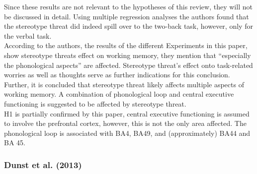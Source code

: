 \documentclass[
  stu]{apa7}
\begin{document}
Since these results are not relevant to the hypotheses of this review, they will not be discussed in detail.
Using multiple regression analyses the authors found that the stereotype threat did indeed spill over to the two-back task, however, only for the verbal task.\\
According to the authors, the results of the different Experiments in this paper, show stereotype threats effect on working memory, they mention that ``especially the phonological aspects'' are affected.
Stereotype threat's effect onto task-related worries as well as thoughts serve as further indications for this conclusion.
Further, it is concluded that stereotype threat likely affects multiple aspects of working memory.
A combination of phonological loop and central executive functioning is suggested to be affected by stereotype threat.\\
H1 is partially confirmed by this paper, central executive functioning is assumed to involve the prefrontal cortex, however, this is not the only area affected.
The phonological loop is associated with BA4, BA49, and (approximately) BA44 and BA 45.

\subsubsection{Dunst et al. (2013)}\label{dunstsexdifferencesneural2013}
\end{document}
